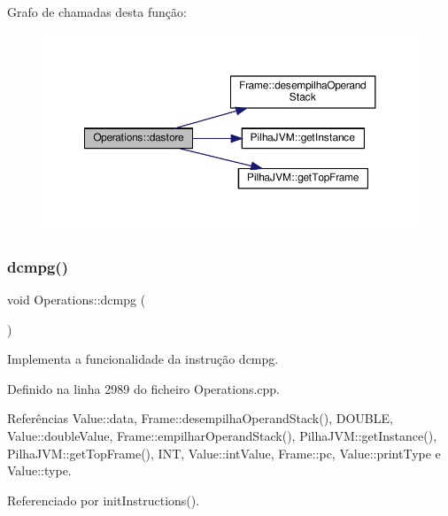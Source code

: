 Grafo de chamadas desta função\+:
\nopagebreak
\begin{figure}[H]
\begin{center}
\leavevmode
\includegraphics[width=350pt]{classOperations_a9735fdb8ba4ea2d7b8b32e8d0a5d2f72_cgraph}
\end{center}
\end{figure}
\mbox{\label{classOperations_a7c2a5194de7a2a59ada752001b8ece0a}} 
\subsubsection{\texorpdfstring{dcmpg()}{dcmpg()}}
{\footnotesize\ttfamily void Operations\+::dcmpg (\begin{DoxyParamCaption}{ }\end{DoxyParamCaption})\hspace{0.3cm}{\ttfamily [private]}}



Implementa a funcionalidade da instrução dcmpg. 



Definido na linha 2989 do ficheiro Operations.\+cpp.



Referências Value\+::data, Frame\+::desempilha\+Operand\+Stack(), D\+O\+U\+B\+LE, Value\+::double\+Value, Frame\+::empilhar\+Operand\+Stack(), Pilha\+J\+V\+M\+::get\+Instance(), Pilha\+J\+V\+M\+::get\+Top\+Frame(), I\+NT, Value\+::int\+Value, Frame\+::pc, Value\+::print\+Type e Value\+::type.



Referenciado por init\+Instructions().

